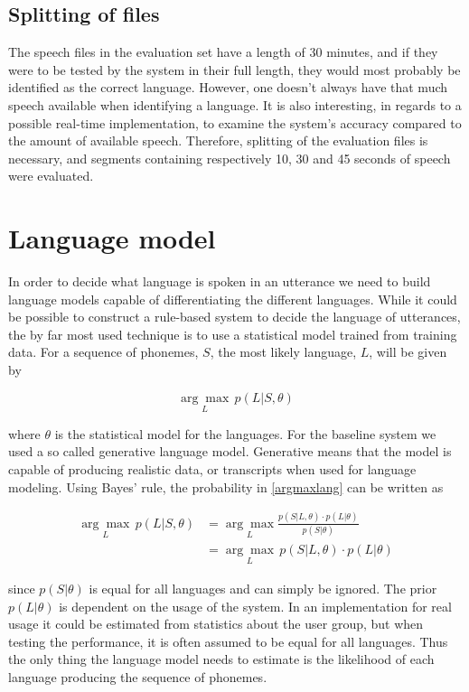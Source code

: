 \subsection{Splitting of files}\label{chap:splitfiles}
The speech files in the evaluation set have a length of 30 minutes, and if they were to be tested by the system in their full length, they would most probably be identified as the correct language. However, one doesn't always have that much speech available when identifying a language. It is also interesting, in regards to a possible real-time implementation, to examine the system's accuracy compared to the amount of available speech. Therefore, splitting of the evaluation files is necessary, and segments containing respectively 10, 30 and 45 seconds of speech were evaluated.




\section{Language model}

In order to decide what language is spoken in an utterance we need to build language models capable of differentiating the different languages. While it could be possible to construct a rule-based system to decide the language of utterances, the by far most used technique is to use a statistical model trained from training data. For a sequence of phonemes, $S$, the most likely language, $L$, will be given by 

\begin{equation}\label{argmaxlang}
\underset{L}{\arg\max} \, p(L|S, \theta)
\end{equation}

where $\theta$ is the statistical model for the languages. For the baseline system we used a so called generative language model. Generative means that the model is capable of producing realistic data, or transcripts when used for language modeling. Using Bayes' rule, the probability in \ref{argmaxlang} can be written as

\begin{align}\label{langmaxlike}
\underset{L}{\arg\max} \, p(L|S, \theta) &=\underset{L}{\arg\max}\frac{p(S|L, \theta)\cdot p(L|\theta)}{p(S|\theta)} \\
&= \underset{L}{\arg\max} \, p(S|L, \theta)\cdot p(L|\theta)
\end{align}

since $p(S|\theta)$ is equal for all languages and can simply be ignored. The prior $p(L|\theta)$ is dependent on the usage of the system. In an implementation for real usage it could be estimated from statistics about the user group, but when testing the performance, it is often assumed to be equal for all languages. Thus the only thing the language model needs to estimate is the likelihood of each language producing the sequence of phonemes. 

